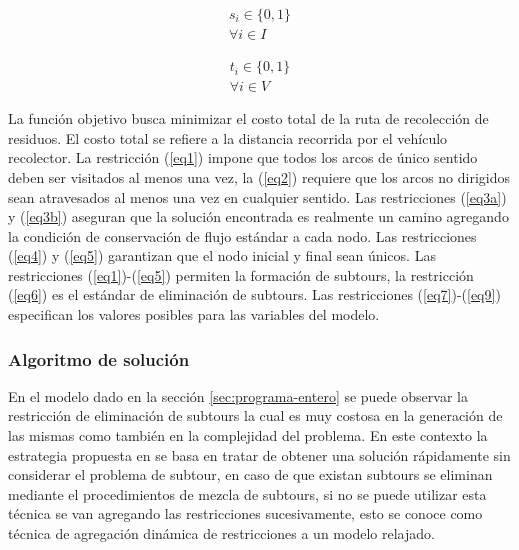 \begin{equation} \tag{8} \label{eq8}
\begin{gathered}
    s_i \in \{0,1\} \\
    \forall i \in I
\end{gathered}
\end{equation}
\hbox{}

\begin{equation} \tag{9} \label{eq9}
\begin{gathered}
    t_i \in \{0,1\} \\
    \forall i \in V
\end{gathered}
\end{equation}

La función objetivo busca minimizar el costo total de la ruta de recolección de residuos. El costo total se refiere a la distancia recorrida por el vehículo recolector. La restricción (\ref{eq1}) impone que todos los arcos de único sentido deben ser visitados al menos una vez, la (\ref{eq2}) requiere que los arcos no dirigidos sean atravesados al menos una vez en cualquier sentido. Las restricciones (\ref{eq3a}) y (\ref{eq3b}) aseguran que la solución encontrada es realmente un camino agregando la condición de conservación de flujo estándar a cada nodo. Las restricciones (\ref{eq4}) y (\ref{eq5}) garantizan que el nodo inicial y final sean únicos. Las restricciones (\ref{eq1})-(\ref{eq5}) permiten la formación de subtours, la restricción (\ref{eq6}) es el estándar de eliminación de subtours. Las restricciones (\ref{eq7})-(\ref{eq9}) especifican los valores posibles para las variables del modelo.

\subsubsection{Algoritmo de solución}
\label{algoritmo-solucion}

En el modelo dado en la sección \ref{sec:programa-entero} se puede observar la restricción de eliminación de subtours la cual es muy costosa en la generación de las mismas como también en la complejidad del problema. En este contexto la estrategia propuesta en \citet{Braier2017AnArgentina} se basa en tratar de obtener una solución rápidamente sin considerar el problema de subtour, en caso de que existan subtours se eliminan mediante el procedimientos de mezcla de subtours, si no se puede utilizar esta técnica se van agregando las restricciones sucesivamente, esto se conoce como técnica de agregación dinámica de restricciones a un modelo relajado.

